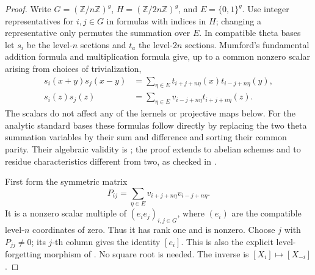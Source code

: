 \documentclass[11pt]{article}
\theoremstyle{definition}
\theoremstyle{remark}
\begin{document}
\begin{proof}
Write \(G=(\mathbb Z/n\mathbb Z)^g\),
\(H=(\mathbb Z/2n\mathbb Z)^g\), and
\(E=\{0,1\}^g\). Use integer representatives for \(i,j\in G\)
in formulas with indices in \(H\); changing a representative only
permutes the summation over \(E\).
In compatible theta bases let \(s_i\) be the level-\(n\) sections
and \(t_a\) the level-\(2n\) sections. Mumford's fundamental
addition formula and multiplication formula give, up to a common
nonzero scalar arising from choices of trivialization,
\begin{align}
 s_i(x+y)s_j(x-y)
   &=\sum_{\eta\in E}
       t_{i+j+n\eta}(x)t_{i-j+n\eta}(y),
       \label{eq:theta-product-addition}\\
 s_i(z)s_j(z)
   &=\sum_{\eta\in E}
       v_{i-j+n\eta}t_{i+j+n\eta}(z).
       \label{eq:theta-multiplication-matrix}
\end{align}
The scalars do not affect any of the kernels or projective maps below.
For the analytic standard bases these formulas follow directly by
replacing the two theta summation variables by their sum and difference
and sorting their common parity. Their algebraic validity is
\citet[\S3, fundamental addition formula, p.~324;
multiplication formula, p.~330]{Mumford1966}; the proof extends to
abelian schemes and to residue characteristics different from two,
as checked in \citet[\S6, Step~III, pp.~92--94]{Mumford1967}.

First form the symmetric matrix
\[
 P_{ij}=\sum_{\eta\in E}
     v_{i+j+n\eta}v_{i-j+n\eta}.
\]
It is a nonzero scalar multiple of \((e_i e_j)_{i,j\in G}\), where
\((e_i)\) are the compatible level-\(n\) coordinates of zero.
Thus it has rank one and is nonzero. Choose \(j\) with
\(P_{jj}\ne0\); its \(j\)-th column gives the identity \([e_i]\).
This is also the explicit level-forgetting morphism of
\citet[\S6, Step~II, p.~85]{Mumford1967}. No square root is needed.
The inverse is \([X_i]\mapsto[X_{-i}]\).


\end{proof}
\end{document}
